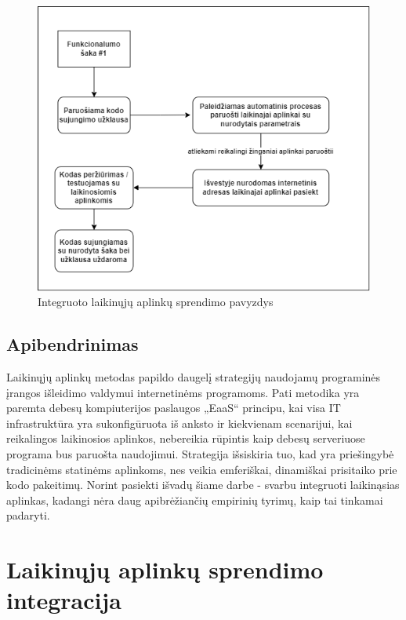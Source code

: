 \documentclass{VUMIFPSkursinis}
\begin{document}
\begin{figure}[H]
    \centering
    \includegraphics[scale=0.6]{img/PvzBuduv2.png}
    \caption{Integruoto laikinųjų aplinkų sprendimo pavyzdys}
    \label{img:mlp}
\end{figure}

\subsection{Apibendrinimas}

Laikinųjų aplinkų metodas papildo daugelį strategijų naudojamų programinės įrangos išleidimo valdymui internetinėms programoms. Pati metodika yra paremta debesų kompiuterijos paslaugos „EaaS“ principu, kai visa IT infrastruktūra yra sukonfigūruota iš anksto ir kiekvienam scenarijui, kai reikalingos laikinosios aplinkos, nebereikia rūpintis kaip debesų serveriuose programa bus paruošta naudojimui. Strategija išsiskiria tuo, kad yra priešingybė tradicinėms statinėms aplinkoms, nes veikia emferiškai, dinamiškai prisitaiko prie kodo pakeitimų. Norint pasiekti išvadų šiame darbe - svarbu integruoti laikinąsias aplinkas, kadangi nėra daug apibrėžiančių empirinių tyrimų, kaip tai tinkamai padaryti.


\section{Laikinųjų aplinkų sprendimo integracija}
\end{document}

